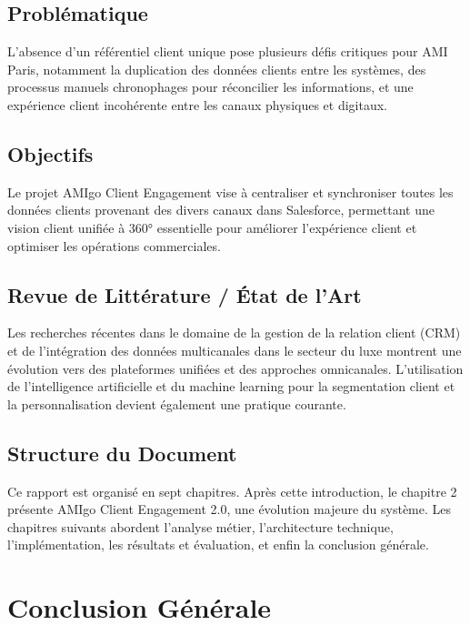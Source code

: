 \documentclass[12pt,a4paper]{report}
\begin{document}
\section{Problématique}
L'absence d'un référentiel client unique pose plusieurs défis critiques pour AMI Paris, notamment la duplication des données clients entre les systèmes, des processus manuels chronophages pour réconcilier les informations, et une expérience client incohérente entre les canaux physiques et digitaux.

\section{Objectifs}
Le projet AMIgo Client Engagement vise à centraliser et synchroniser toutes les données clients provenant des divers canaux dans Salesforce, permettant une vision client unifiée à 360° essentielle pour améliorer l'expérience client et optimiser les opérations commerciales.

\section{Revue de Littérature / État de l'Art}
Les recherches récentes dans le domaine de la gestion de la relation client (CRM) et de l'intégration des données multicanales dans le secteur du luxe montrent une évolution vers des plateformes unifiées et des approches omnicanales. L'utilisation de l'intelligence artificielle et du machine learning pour la segmentation client et la personnalisation devient également une pratique courante.

\section{Structure du Document}
Ce rapport est organisé en sept chapitres. Après cette introduction, le chapitre 2 présente AMIgo Client Engagement 2.0, une évolution majeure du système. Les chapitres suivants abordent l'analyse métier, l'architecture technique, l'implémentation, les résultats et évaluation, et enfin la conclusion générale.

% 
% 

\chapter{Conclusion Générale}
\end{document}

